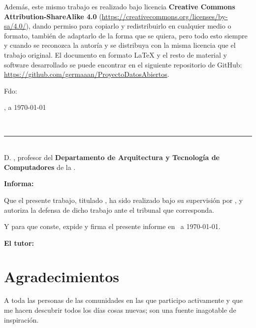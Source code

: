 \bigskip
Además, este mismo trabajo es realizado bajo licencia \textbf{Creative Commons Attribution-ShareAlike 4.0} (\url{https://creativecommons.org/licenses/by-sa/4.0/}), dando permiso para copiarlo y redistribuirlo en cualquier medio o formato, también de adaptarlo de la forma que se quiera, pero todo esto siempre y cuando se reconozca la autoría y se distribuya con la misma licencia que el trabajo original. El documento en formato {\sf LaTeX} y el resto de material y software desarrollado se puede encontrar en el siguiente repositorio de {\sf GitHub}: \url{https://github.com/germaaan/ProyectoDatosAbiertos}.

\vspace{4cm}

\noindent Fdo: \autor

\vspace{2cm}

\begin{flushright}
\ciudad, a \today
\end{flushright}

\newpage
\thispagestyle{empty}
\
\vspace{3cm}

\noindent\rule[-1ex]{\textwidth}{2pt}\\[4.5ex]

D. \textbf{\tutor}, profesor del \textbf{Departamento de Arquitectura y Tecnología de Computadores} de la \textbf{\universidad}.

\vspace{0.5cm}

\vspace{0.5cm}

\textbf{Informa:}

\vspace{0.5cm}

Que el presente trabajo, titulado \textit{\textbf{\titulo}}, ha sido realizado bajo su supervisión por \textbf{\autor}, y 
autoriza la defensa de dicho trabajo ante el tribunal que corresponda.

\vspace{0.5cm}

Y para que conste, expide y firma el presente informe en \ciudad\ a \today.

\vspace{1cm}

\textbf{El tutor:}

\vspace{5cm}

\noindent \textbf{\tutor}

\chapter*{Agradecimientos}
\thispagestyle{empty}

\vspace{1cm}

A toda las personas de las comunidades en las que participo activamente y que me hacen descubrir todos los días cosas nuevas; son una fuente inagotable de inspiración.